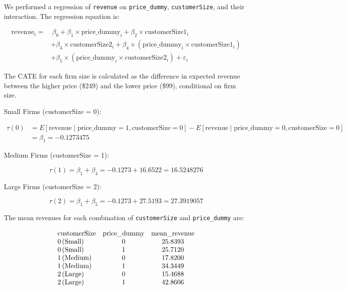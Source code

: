 \documentclass{article}
\begin{document}
We performed a regression of \texttt{revenue} on \texttt{price\_dummy}, \texttt{customerSize}, and their interaction. The regression equation is:

\begin{align*}
    \text{revenue}_i =& \ \beta_0 + \beta_1 \times \text{price\_dummy}_i + \beta_2 \times \text{customerSize1}_i \\ &+ \beta_3 \times \text{customerSize2}_i + \beta_4 \times (\text{price\_dummy}_i \times \text{customerSize1}_i) \\ &+ \beta_5 \times (\text{price\_dummy}_i \times \text{customerSize2}_i) + \varepsilon_i
\end{align*}

The CATE for each firm size is calculated as the difference in expected revenue between the higher price (\$249) and the lower price (\$99), conditional on firm size.

Small Firms (customerSize = 0):

\begin{align*}
    \tau(0) &= E[\text{revenue} \mid \text{price\_dummy} = 1, \text{customerSize} = 0] - E[\text{revenue} \mid \text{price\_dummy} = 0, \text{customerSize} = 0] \\
    &= \beta_1 = -0.1273475
\end{align*}

Medium Firms (customerSize = 1):

\[
\tau(1) = \beta_1 + \beta_4 = -0.1273 + 16.6522 = 16.5248276
\]

Large Firms (customerSize = 2):

\[
\tau(2) = \beta_1 + \beta_5 = -0.1273 + 27.5193 = 27.3919057
\]

The mean revenues for each combination of \texttt{customerSize} and \texttt{price\_dummy} are:

\[
\begin{array}{l c c}
\text{customerSize} & \text{price\_dummy} & \text{mean\_revenue} \\
0 \,(\text{Small}) & 0 & 25.8393 \\
0 \,(\text{Small}) & 1 & 25.7120 \\
1 \,(\text{Medium}) & 0 & 17.8200 \\
1 \,(\text{Medium}) & 1 & 34.3449 \\
2 \,(\text{Large}) & 0 & 15.4688 \\
2 \,(\text{Large}) & 1 & 42.8606 \\
\end{array}
\]
\end{document}
